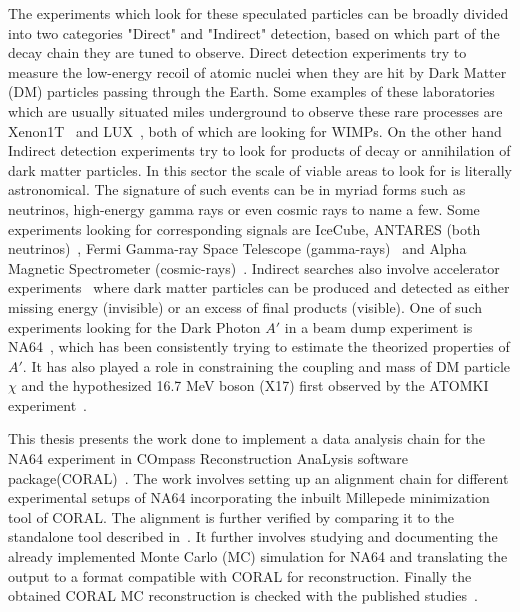 The experiments which look for these speculated particles can be broadly divided into two categories "Direct" and "Indirect" detection, based on which part of the decay chain they are tuned to observe. Direct detection experiments try to measure the low-energy recoil of atomic nuclei when they are hit by Dark Matter (DM) particles passing through the Earth. Some examples of these laboratories which are usually situated miles underground to observe these rare processes are Xenon1T~\cite{PhysRevLett.121.111302} and LUX~\cite{Akerib_2017}, both of which are looking for WIMPs. On the other hand Indirect detection experiments try to look for products of decay or annihilation of dark matter particles. In this sector the scale of viable areas to look for is literally astronomical. The signature of such events can be in myriad forms such as neutrinos, high-energy gamma rays or even cosmic rays to name a few. Some experiments looking for corresponding signals are IceCube, ANTARES (both neutrinos)~\cite{IceCube2018MultimessengerOO,Adri_n_Mart_nez_2016}, Fermi Gamma-ray Space Telescope (gamma-rays)~\cite{Hooper_2011} and  Alpha Magnetic Spectrometer (cosmic-rays)~\cite{PhysRevLett.118.191101}.
Indirect searches also involve accelerator experiments~\cite{essig2013dark} where dark matter particles can be produced and detected as either missing energy (invisible) or an excess of final products (visible). One of such experiments looking for the Dark Photon $A'$ in a beam dump experiment is NA64~\cite{andreas2013proposal}, which has been consistently trying to estimate the theorized properties of $A'$. It has also played a role in constraining the coupling and mass of DM particle $\chi$ and the hypothesized 16.7 MeV boson (X17) first observed by the ATOMKI experiment~\cite{Krasznahorkay_2016,krasznahorkay2019new}.

This thesis presents the work done to implement a data analysis chain for the NA64 experiment in COmpass Reconstruction AnaLysis software package(CORAL)~\cite{Collaboration2007TheCE}. The work involves setting up an alignment chain for different experimental setups of NA64 incorporating the inbuilt Millepede minimization tool of CORAL. The alignment is further verified by comparing it to the standalone tool described in~\cite{nabeel:2018}. It further involves studying and documenting the already implemented Monte Carlo (MC) simulation for NA64 and translating the output to a format compatible with CORAL for reconstruction. Finally the obtained CORAL MC reconstruction is checked with the published studies~\cite{PhysRevD.97.072002}.
